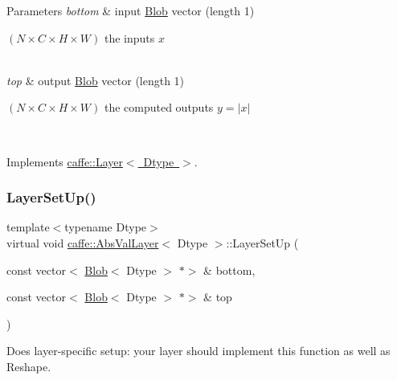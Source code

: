 \begin{DoxyParams}{Parameters}
{\em bottom} & input \mbox{\hyperlink{classcaffe_1_1_blob}{Blob}} vector (length 1)
\begin{DoxyEnumerate}
\item $ (N \times C \times H \times W) $ the inputs $ x $ 
\end{DoxyEnumerate}\\
\hline
{\em top} & output \mbox{\hyperlink{classcaffe_1_1_blob}{Blob}} vector (length 1)
\begin{DoxyEnumerate}
\item $ (N \times C \times H \times W) $ the computed outputs $ y = |x| $ 
\end{DoxyEnumerate}\\
\hline
\end{DoxyParams}


Implements \mbox{\hyperlink{classcaffe_1_1_layer_a576ac6a60b1e99fe383831f52a6cea77}{caffe\+::\+Layer$<$ Dtype $>$}}.

\mbox{\label{classcaffe_1_1_abs_val_layer_a5bc321f94f7d13e938e31131fc55487b}} 
\subsubsection{\texorpdfstring{Layer\+Set\+Up()}{LayerSetUp()}\hspace{0.1cm}{\footnotesize\ttfamily [1/2]}}
{\footnotesize\ttfamily template$<$typename Dtype$>$ \\
virtual void \mbox{\hyperlink{classcaffe_1_1_abs_val_layer}{caffe\+::\+Abs\+Val\+Layer}}$<$ Dtype $>$\+::Layer\+Set\+Up (\begin{DoxyParamCaption}\item[{const vector$<$ \mbox{\hyperlink{classcaffe_1_1_blob}{Blob}}$<$ Dtype $>$ $\ast$$>$ \&}]{bottom,  }\item[{const vector$<$ \mbox{\hyperlink{classcaffe_1_1_blob}{Blob}}$<$ Dtype $>$ $\ast$$>$ \&}]{top }\end{DoxyParamCaption})\hspace{0.3cm}{\ttfamily [virtual]}}



Does layer-\/specific setup\+: your layer should implement this function as well as Reshape. 


